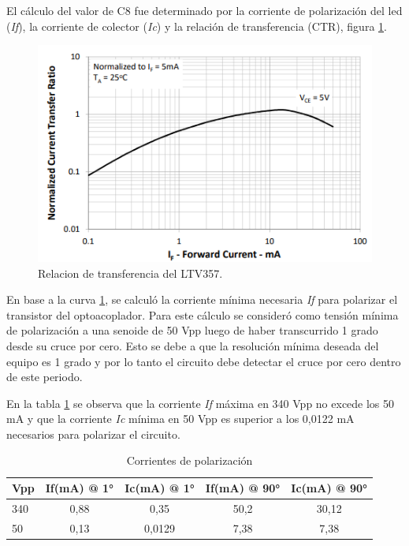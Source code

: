 \newpage

El cálculo del valor de C8 fue determinado por la corriente de polarización del led (\textit{If}), la corriente de colector (\textit{Ic}) y la relación de transferencia (CTR), figura \ref{fig:ltvCtr}.  

\begin{figure}[ht]
	\centering
	\includegraphics[width=130mm]{./Figures/ltvCtr.png}
	\caption{Relacion de transferencia del LTV357.}
	\label{fig:ltvCtr}
\end{figure}

En base a la curva \ref{fig:ltvCtr}, se calculó la corriente mínima necesaria \textit{If} para polarizar el transistor del optoacoplador. Para este cálculo se consideró como tensión mínima de polarización a una senoide de 50 Vpp luego de haber transcurrido 1 grado desde su cruce por cero. Esto se debe a que la resolución mínima deseada del equipo es 1 grado y por lo tanto el circuito debe detectar el cruce por cero dentro de este periodo.

En la tabla \ref{tab:corriente} se observa que la corriente \textit{If} máxima en 340 Vpp no excede los 50 mA y que la corriente \textit{Ic} mínima en 50 Vpp es superior a los 0,0122 mA necesarios para polarizar el circuito.

\vspace{5mm}

\begin{table}[h]
\centering
\caption[Corrientes de polarización]{Corrientes de polarización}
\begin{tabular}{l c c c c}
\toprule
\textbf{Vpp} & \textbf{If(mA) @ 1°} & \textbf{Ic(mA) @ 1°} & \textbf{If(mA) @ 90°} & \textbf{Ic(mA) @ 90°}\\
\midrule
340 & 0,88 & 0,35 & 50,2 & 30,12 \\
50 & 0,13 & 0,0129 & 7,38 & 7,38\\
\bottomrule
\hline
\end{tabular}
\label{tab:corriente}
\end{table}

